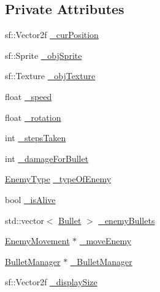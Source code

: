 \subsection*{Private Attributes}
\begin{DoxyCompactItemize}
\item 
sf\+::\+Vector2f \hyperlink{class_enemy_aefebf6e5fb323b9b27510c26707d0013}{\+\_\+cur\+Position}
\item 
sf\+::\+Sprite \hyperlink{class_enemy_a299e3bbee6558cad0e9cd5dc510341a7}{\+\_\+obj\+Sprite}
\item 
sf\+::\+Texture \hyperlink{class_enemy_a9bfc9a676333f13aa3bc87dbabc036b5}{\+\_\+obj\+Texture}
\item 
float \hyperlink{class_enemy_a5ad8a827b28dd24331a434d1993d5c01}{\+\_\+speed}
\item 
float \hyperlink{class_enemy_ad00fabd2ca45f308cf3b0ead95c9bb82}{\+\_\+rotation}
\item 
int \hyperlink{class_enemy_a6c795cbaf685c2b4824601219c39192b}{\+\_\+steps\+Taken}
\item 
int \hyperlink{class_enemy_af922f36da4c166ab18091c297f7faa0e}{\+\_\+damage\+For\+Bullet}
\item 
\hyperlink{_enemy_8h_ac3e413a86119db4b031458c7259e268e}{Enemy\+Type} \hyperlink{class_enemy_a28e9fad6f896986b88f53895f6bba866}{\+\_\+type\+Of\+Enemy}
\item 
bool \hyperlink{class_enemy_ae9c6779193a20e666d0d1ec4091d35d9}{\+\_\+is\+Alive}
\item 
std\+::vector$<$ \hyperlink{class_bullet}{Bullet} $>$ \hyperlink{class_enemy_ab0fb1cab49fa8580cd6ba8ce3d70b32e}{\+\_\+enemy\+Bullets}
\item 
\hyperlink{class_enemy_movement}{Enemy\+Movement} $\ast$ \hyperlink{class_enemy_a3a0b038e3f79797e8e1ef32b1ec441e0}{\+\_\+move\+Enemy}
\item 
\hyperlink{class_bullet_manager}{Bullet\+Manager} $\ast$ \hyperlink{class_enemy_a5f5dbc651e786307c64b99b6a4219f99}{\+\_\+\+Bullet\+Manager}
\item 
sf\+::\+Vector2f \hyperlink{class_enemy_a27fcc8bffa13feb1097d41f4fa0532f8}{\+\_\+display\+Size}
\end{DoxyCompactItemize}
